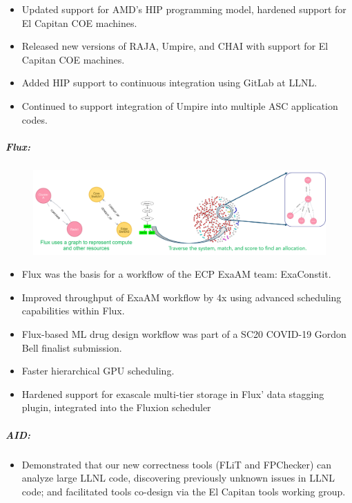 \begin{itemize}
\item Updated support for AMD's HIP programming model, hardened support for El Capitan COE machines.
\item Released new versions of RAJA, Umpire, and CHAI with support for El Capitan COE machines.
\item Added HIP support to continuous integration using GitLab at LLNL.
\item Continued to support integration of Umpire into multiple ASC application codes.
\end{itemize}

\subparagraph{Flux:}
\begin{figure}[tb]
\centering
\includegraphics[width=\textwidth]{projects/2.3.6-NNSA/2.3.6.02-LLNL-ATDM/flux-resource-model.pdf}
\end{figure}

\begin{itemize}

\item Flux was the basis for a workflow of the ECP ExaAM team: ExaConstit.
\item Improved throughput of ExaAM workflow by 4x using advanced scheduling capabilities within Flux.
\item Flux-based ML drug design workflow was part of a SC20 COVID-19 Gordon Bell finalist submission.
\item Faster hierarchical GPU scheduling.
\item Hardened support for exascale multi-tier storage in Flux' data stagging plugin, integrated
      into the Fluxion scheduler

\end{itemize}

\subparagraph{AID:}
\begin{itemize}

\item Demonstrated that our new correctness tools (FLiT and FPChecker) can analyze large LLNL code, discovering previously unknown issues in LLNL code; and facilitated tools co-design via the El Capitan tools working group.


\end{itemize}


